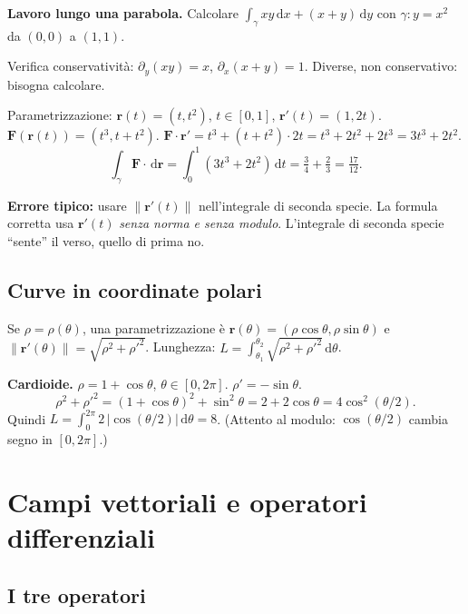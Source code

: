 \documentclass[11pt,a4paper,openany]{book}
\theoremstyle{plain}
\theoremstyle{definition}
\theoremstyle{remark}
\newcommand{\dd}{\,\mathrm{d}}
\newcommand{\F}{\mathbf{F}}
\newcommand{\rr}{\mathbf{r}}
\newcommand{\norm}[1]{\left\lVert #1 \right\rVert}
\begin{document}
\begin{esempio}
\textbf{Lavoro lungo una parabola.} Calcolare
$\int_\gamma xy\dd x+(x+y)\dd y$ con $\gamma:y=x^2$ da $(0,0)$ a $(1,1)$.

Verifica conservativit\`a: $\partial_y(xy)=x$, $\partial_x(x+y)=1$. Diverse,
non conservativo: bisogna calcolare.

Parametrizzazione: $\rr(t)=(t,t^2)$, $t\in[0,1]$, $\rr'(t)=(1,2t)$.
$\F(\rr(t))=(t^3,t+t^2)$.
$\F\cdot\rr'=t^3+(t+t^2)\cdot 2t=t^3+2t^2+2t^3=3t^3+2t^2$.
\[
  \int_\gamma\F\cdot\dd\rr=\int_0^1(3t^3+2t^2)\dd t=\tfrac34+\tfrac23=\tfrac{17}{12}.
\]
\end{esempio}

\begin{trappola}
\textbf{Errore tipico:} usare $\norm{\rr'(t)}$ nell'integrale di seconda specie.
La formula corretta usa $\rr'(t)$ \emph{senza norma e senza modulo}. L'integrale
di seconda specie ``sente'' il verso, quello di prima no.
\end{trappola}

\section{Curve in coordinate polari}

Se $\rho=\rho(\theta)$, una parametrizzazione \`e
$\rr(\theta)=(\rho\cos\theta,\rho\sin\theta)$ e
$\norm{\rr'(\theta)}=\sqrt{\rho^2+\rho'^2}$. Lunghezza:
$L=\int_{\theta_1}^{\theta_2}\sqrt{\rho^2+\rho'^2}\dd\theta$.

\begin{esempio}
\textbf{Cardioide.} $\rho=1+\cos\theta$, $\theta\in[0,2\pi]$. $\rho'=-\sin\theta$.
\[
  \rho^2+\rho'^2=(1+\cos\theta)^2+\sin^2\theta=2+2\cos\theta=4\cos^2(\theta/2).
\]
Quindi $L=\int_0^{2\pi}2\,\bigl|\cos(\theta/2)\bigr|\dd\theta=8$. (Attento al
modulo: $\cos(\theta/2)$ cambia segno in $[0,2\pi]$.)
\end{esempio}


\chapter{Campi vettoriali e operatori differenziali}

\section{I tre operatori}
\end{document}

